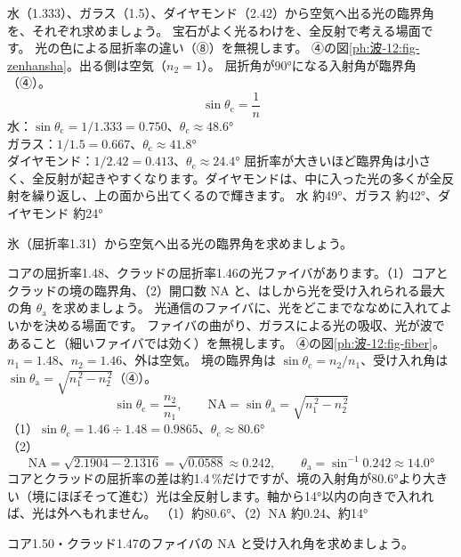 \label{ph:波-12:ex5}
\begin{phreidai}[臨界角とダイヤモンドの輝き]
水（1.333）、ガラス（1.5）、ダイヤモンド（2.42）から空気へ出る光の臨界角を、それぞれ求めましょう。
\phbamen
宝石がよく光るわけを、全反射で考える場面です。
\phmushi
光の色による屈折率の違い（⑧）を無視します。
\phzu
④の図\ref{ph:波-12:fig-zenhansha}。出る側は空気（$n_2=1$）。
\phriyu
屈折角が\ang{90}になる入射角が臨界角（④）。
\phtateru
\[\sin\theta_{\mathrm c}=\frac1n\]
\phtoku
水：$\sin\theta_{\mathrm c}=1/1.333=0.750$、$\theta_{\mathrm c}\approx\ang{48.6}$\\
ガラス：$1/1.5=0.667$、$\theta_{\mathrm c}\approx\ang{41.8}$\\
ダイヤモンド：$1/2.42=0.413$、$\theta_{\mathrm c}\approx\ang{24.4}$
\phtashikame
屈折率が大きいほど臨界角は小さく、全反射が起きやすくなります。ダイヤモンドは、中に入った光の多くが全反射を繰り返し、上の面から出てくるので輝きます。
\kotae 水 約\ang{49}、ガラス 約\ang{42}、ダイヤモンド 約\ang{24}
\end{phreidai}
\begin{jibun}
氷（屈折率1.31）から空気へ出る光の臨界角を求めましょう。
\end{jibun}

\label{ph:波-12:ex6}
\begin{phreidai}[光ファイバの受け入れ角]
コアの屈折率1.48、クラッドの屈折率1.46の光ファイバがあります。（1）コアとクラッドの境の臨界角、（2）開口数 NA と、はしから光を受け入れられる最大の角 $\theta_{\mathrm a}$ を求めましょう。
\phbamen
光通信のファイバに、光をどこまでななめに入れてよいかを決める場面です。
\phmushi
ファイバの曲がり、ガラスによる光の吸収、光が波であること（細いファイバでは効く）を無視します。
\phzu
④の図\ref{ph:波-12:fig-fiber}。$n_1=1.48$、$n_2=1.46$、外は空気。
\phriyu
境の臨界角は $\sin\theta_{\mathrm c}=n_2/n_1$、受け入れ角は $\sin\theta_{\mathrm a}=\sqrt{n_1^{\,2}-n_2^{\,2}}$（④）。
\phtateru
\[\sin\theta_{\mathrm c}=\frac{n_2}{n_1},\qquad\mathrm{NA}=\sin\theta_{\mathrm a}=\sqrt{n_1^{\,2}-n_2^{\,2}}\]
\phtoku
（1）$\sin\theta_{\mathrm c}=1.46\div1.48=0.9865$、$\theta_{\mathrm c}\approx\ang{80.6}$\\
（2）\[\mathrm{NA}=\sqrt{2.1904-2.1316}=\sqrt{0.0588}\approx0.242,\qquad\theta_{\mathrm a}=\sin^{-1}0.242\approx\ang{14.0}\]
\phtashikame
コアとクラッドの屈折率の差は約1.4\,\%だけですが、境の入射角が\ang{80.6}より大きい（境にほぼそって進む）光は全反射します。軸から\ang{14}以内の向きで入れれば、光は外へもれません。
\kotae （1）約\ang{80.6}、（2）NA 約0.24、約\ang{14}
\end{phreidai}
\begin{jibun}
コア1.50・クラッド1.47のファイバの NA と受け入れ角を求めましょう。
\end{jibun}

